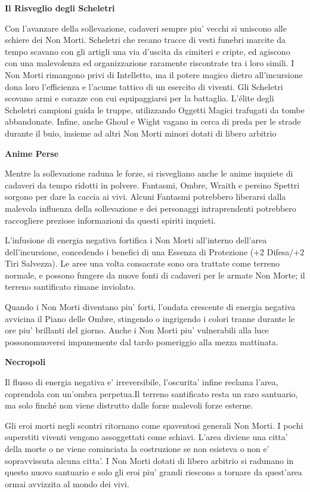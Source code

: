 \documentclass[a4paper,11pt,twoside,openany]{dndbook}
\begin{document}
\textbf{Il Risveglio degli Scheletri}

Con l'avanzare della sollevazione, cadaveri sempre piu' vecchi si uniscono alle schiere dei Non Morti. Scheletri che recano tracce di vesti funebri marcite da tempo scavano con gli artigli una via d'uscita da cimiteri e cripte, ed agiscono con una malevolenza ed organizzazione raramente riscontrate tra i loro simili. I Non Morti rimangono privi di Intelletto, ma il potere magico dietro all'incursione dona loro l'efficienza e l'acume tattico di un esercito di viventi. Gli Scheletri scovano armi e corazze con cui equipaggiarsi per la battaglia. L'élite degli Scheletri campioni guida le truppe, utilizzando Oggetti Magici trafugati da tombe abbandonate. Infine, anche Ghoul e Wight vagano in cerca di preda per le strade durante il buio, insieme ad altri Non Morti minori dotati di libero arbitrio

\textbf{Anime Perse}

Mentre la sollevazione raduna le forze, si risvegliano anche le anime inquiete di cadaveri da tempo ridotti in polvere. Fantasmi, Ombre, Wraith e persino Spettri sorgono per dare la caccia ai vivi. Alcuni Fantasmi potrebbero liberarsi dalla malevola influenza della sollevazione e dei personaggi intraprendenti potrebbero raccogliere preziose informazioni da questi spiriti inquieti.

L'infusione di energia negativa fortifica i Non Morti all'interno dell'area dell'incursione, concedendo i benefici di una Essenza di Protezione (+2 Difesa/+2 Tiri Salvezza). Le aree una volta consacrate sono ora trattate come terreno normale, e possono fungere da nuove fonti di cadaveri per le armate Non Morte; il terreno santificato rimane inviolato.

Quando i Non Morti diventano piu' forti, l'ondata crescente di energia negativa avvicina il Piano delle Ombre, stingendo o ingrigendo i colori tranne durante le ore piu' brillanti del giorno. Anche i Non Morti piu' vulnerabili alla luce possonomuoversi impunemente dal tardo pomeriggio alla mezza mattinata.

\textbf{Necropoli}

Il flusso di energia negativa e' irreversibile, l'oscurita' infine reclama l'area, coprendola con un'ombra perpetua.Il terreno santificato resta un raro santuario, ma solo finché non viene distrutto dalle forze malevoli forze esterne.

Gli eroi morti negli scontri ritornano come spaventosi generali Non Morti. I pochi superstiti viventi vengono assoggettati come schiavi. L'area diviene una citta' della morte o ne viene cominciata la costruzione se non esisteva o non e' sopravvissuta alcuna citta'. I Non Morti dotati di libero arbitrio si radunano in questo nuovo santuario e solo gli eroi piu' grandi riescono a tornare da quest'area ormai avvizzita al mondo dei vivi.
\end{document}
